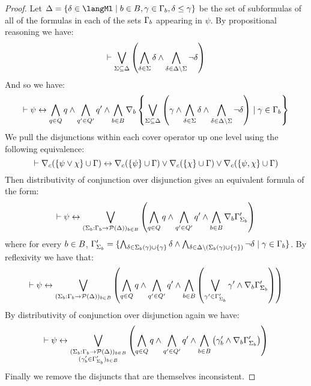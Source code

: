 \begin{proof}
Let $\Delta = \{\delta \in \langMl \mid \agentB \in \agentsB, \gamma \in \Gamma_\agentB, \delta \leq \gamma\}$ be the set of subformulas of all of the formulas in each of the sets $\Gamma_b$ appearing in $\psi$.
By propositional reasoning we have:
$$
\vdash \bigvee_{\Sigma \subseteq \Delta} \left( \bigwedge_{\delta \in \Sigma} \delta \land \bigwedge_{\delta \in \Delta \setminus \Sigma} \neg \delta \right) 
$$
And so we have:
$$
\vdash \psi \leftrightarrow \bigwedge_{q \in Q} q \land \bigwedge_{q' \in Q'} q' \land \bigwedge_{b \in B} \nabla_{b} \left\{ \bigvee_{\Sigma \subseteq \Delta} \left( \gamma \land \bigwedge_{\delta \in \Sigma} \delta \land \bigwedge_{\delta \in \Delta \setminus \Sigma} \neg \delta \right) \mid \gamma \in \Gamma_b \right\}
$$
We pull the disjunctions within each cover operator up one level using the following equivalence:
$$
\vdash \nabla_{c} (\{\psi \lor \chi\} \cup \Gamma) \leftrightarrow \nabla_{c} (\{\psi\} \cup \Gamma) \lor \nabla_{c} (\{\chi\} \cup \Gamma) \lor \nabla_{c} (\{\psi, \chi\} \cup \Gamma)
$$
Then distributivity of conjunction over disjunction gives an equivalent formula of the form:
$$
\vdash \psi \leftrightarrow
\bigvee_{(\Sigma_b : \Gamma_b \to \mathcal{P}(\Delta))_{b \in B}} \left( \bigwedge_{q \in Q} q \land \bigwedge_{q' \in Q'} q' \land \bigwedge_{b \in B} \nabla_{b} \Gamma'_{\Sigma_b} \right)
$$
where for every $b \in B$, $\Gamma'_{\Sigma_b} = \{\bigwedge_{\delta \in \Sigma_b(\gamma) \cup \{\gamma\}} \delta \land \bigwedge_{\delta \in \Delta \setminus (\Sigma_b(\gamma) \cup \{\gamma\})} \neg \delta \mid \gamma \in \Gamma_b\}$.
By reflexivity we have that:
$$
\vdash \psi \leftrightarrow
\bigvee_{(\Sigma_b : \Gamma_b \to \mathcal{P}(\Delta))_{b \in B}} \left( \bigwedge_{q \in Q} q \land \bigwedge_{q' \in Q'} q' \land \bigwedge_{b \in B} \left(\bigvee_{\gamma' \in \Gamma'_{\Sigma_b}} \gamma' \land \nabla_{b} \Gamma'_{\Sigma_b} \right) \right)
$$
By distributivity of conjunction over disjunction again we have:
$$
\vdash \psi \leftrightarrow
\bigvee_{\substack{(\Sigma_b : \Gamma_b \to \mathcal{P}(\Delta))_{b \in B}\\(\gamma'_b \in \Gamma'_{\Sigma_b})_{b \in B}}}
\left( \bigwedge_{q \in Q} q \land \bigwedge_{q' \in Q'} q' \land \bigwedge_{b \in B} \left(\gamma'_b \land \nabla_{b} \Gamma'_{\Sigma_b} \right) \right)
$$
Finally we remove the disjuncts that are themselves inconsistent.


\end{proof}
